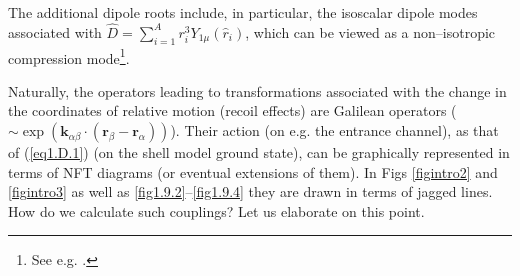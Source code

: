 \begin{subappendices}
The additional dipole roots include, in particular, the isoscalar dipole modes associated with $\hat D=\sum_{i=1}^{A}r^3_iY_{1\mu}(\hat r_i)$, which can be viewed as a non--isotropic compression mode\footnote{See e.g. \cite{Colo:00}.}.

Naturally, the operators leading to transformations associated with the change in the coordinates of relative motion (recoil effects) are Galilean operators ($\sim\exp\left(\mathbf k_{\alpha\beta}\cdot(\mathbf r_\beta-\mathbf{r}_\alpha)\right)$). Their action (on e.g. the entrance channel), as that of (\ref{eq1.D.1}) (on the shell model ground state), can be graphically represented in terms of NFT diagrams (or eventual extensions of them). In Figs \ref{figintro2} and \ref{figintro3} as well as \ref{fig1.9.2}--\ref{fig1.9.4}  they are drawn in terms of jagged lines. How do we calculate such couplings? Let us elaborate  on this point.



\end{subappendices}
